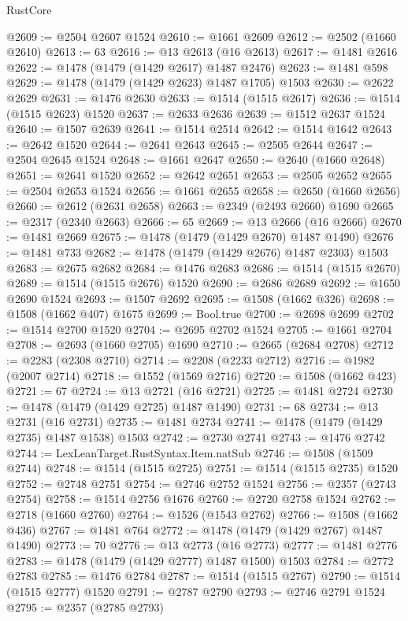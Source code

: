 \begin{lexlean}{RustCore}
\begin{coremodule}
@2609 := @2504 @2607 @1524
@2610 := @1661 @2609
@2612 := @2502 (@1660 @2610)
@2613 := 63
@2616 := @13 @2613 (@16 @2613)
@2617 := @1481 @2616
@2622 := @1478 (@1479 (@1429 @2617) @1487 @2476)
@2623 := @1481 @598
@2629 := @1478 (@1479 (@1429 @2623) @1487 @1705) @1503
@2630 := @2622 @2629
@2631 := @1476 @2630
@2633 := @1514 (@1515 @2617)
@2636 := @1514 (@1515 @2623) @1520
@2637 := @2633 @2636
@2639 := @1512 @2637 @1524
@2640 := @1507 @2639
@2641 := @1514 @2514
@2642 := @1514 @1642
@2643 := @2642 @1520
@2644 := @2641 @2643
@2645 := @2505 @2644
@2647 := @2504 @2645 @1524
@2648 := @1661 @2647
@2650 := @2640 (@1660 @2648)
@2651 := @2641 @1520
@2652 := @2642 @2651
@2653 := @2505 @2652
@2655 := @2504 @2653 @1524
@2656 := @1661 @2655
@2658 := @2650 (@1660 @2656)
@2660 := @2612 (@2631 @2658)
@2663 := @2349 (@2493 @2660) @1690
@2665 := @2317 (@2340 @2663)
@2666 := 65
@2669 := @13 @2666 (@16 @2666)
@2670 := @1481 @2669
@2675 := @1478 (@1479 (@1429 @2670) @1487 @1490)
@2676 := @1481 @733
@2682 := @1478 (@1479 (@1429 @2676) @1487 @2303) @1503
@2683 := @2675 @2682
@2684 := @1476 @2683
@2686 := @1514 (@1515 @2670)
@2689 := @1514 (@1515 @2676) @1520
@2690 := @2686 @2689
@2692 := @1650 @2690 @1524
@2693 := @1507 @2692
@2695 := @1508 (@1662 @326)
@2698 := @1508 (@1662 @407) @1675
@2699 := Bool.true
@2700 := @2698 @2699
@2702 := @1514 @2700 @1520
@2704 := @2695 @2702 @1524
@2705 := @1661 @2704
@2708 := @2693 (@1660 @2705) @1690
@2710 := @2665 (@2684 @2708)
@2712 := @2283 (@2308 @2710)
@2714 := @2208 (@2233 @2712)
@2716 := @1982 (@2007 @2714)
@2718 := @1552 (@1569 @2716)
@2720 := @1508 (@1662 @423)
@2721 := 67
@2724 := @13 @2721 (@16 @2721)
@2725 := @1481 @2724
@2730 := @1478 (@1479 (@1429 @2725) @1487 @1490)
@2731 := 68
@2734 := @13 @2731 (@16 @2731)
@2735 := @1481 @2734
@2741 := @1478 (@1479 (@1429 @2735) @1487 @1538) @1503
@2742 := @2730 @2741
@2743 := @1476 @2742
@2744 := LexLeanTarget.RustSyntax.Item.natSub
@2746 := @1508 (@1509 @2744)
@2748 := @1514 (@1515 @2725)
@2751 := @1514 (@1515 @2735) @1520
@2752 := @2748 @2751
@2754 := @2746 @2752 @1524
@2756 := @2357 (@2743 @2754)
@2758 := @1514 @2756 @1676
@2760 := @2720 @2758 @1524
@2762 := @2718 (@1660 @2760)
@2764 := @1526 (@1543 @2762)
@2766 := @1508 (@1662 @436)
@2767 := @1481 @764
@2772 := @1478 (@1479 (@1429 @2767) @1487 @1490)
@2773 := 70
@2776 := @13 @2773 (@16 @2773)
@2777 := @1481 @2776
@2783 := @1478 (@1479 (@1429 @2777) @1487 @1500) @1503
@2784 := @2772 @2783
@2785 := @1476 @2784
@2787 := @1514 (@1515 @2767)
@2790 := @1514 (@1515 @2777) @1520
@2791 := @2787 @2790
@2793 := @2746 @2791 @1524
@2795 := @2357 (@2785 @2793)

\end{coremodule}
\end{lexlean}
